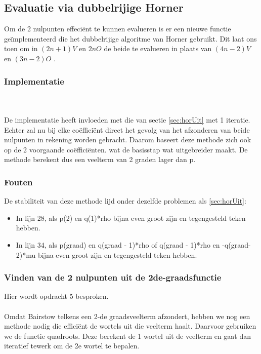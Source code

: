 \documentclass[a4paper,kulak]{kulakarticle}
\begin{document}
\subsection{Evaluatie via dubbelrijige Horner}

Om de 2 nulpunten effeciënt te kunnen evalueren is er een nieuwe functie geïmplementeerd die het dubbelrijige algoritme van Horner gebruikt. Dit laat ons toen om in $(2n+1)V$ en $2nO$ de beide te evalueren in plaats van $(4n-2)V$ en $(3n-2)O$ \cite{bultheel2006inleiding}.

\subsubsection{Implementatie}

~\\~\\
De implementatie heeft invloeden met die van sectie \ref{sec:horUit} met 1 iteratie. Echter zal nu bij elke coëfficiënt direct het gevolg van het afzonderen van beide nulpunten in rekening worden gebracht. Daarom baseert deze methode zich ook op de 2 voorgaande coëfficiënten. wat de basisstap wat uitgebreider maakt. De methode berekent dus een veelterm van 2 graden lager dan p. 

\subsubsection{Fouten}

De stabiliteit van deze methode lijd onder dezelfde problemen als \ref{sec:horUit}:
\begin{itemize}
	\item In lijn 28, als p(2) en q(1)*rho bijna even groot zijn en tegengesteld teken hebben.
	\item In lijn 34, als p(graad) en q(graad - 1)*rho of q(graad - 1)*rho en -q(graad-2)*mu bijna even groot zijn en tegengesteld teken hebben.
\end{itemize}
\subsubsection{Vinden van de 2 nulpunten uit de 2de-graadsfunctie}
Hier wordt opdracht 5 besproken.
\\~\\
Omdat Bairstow telkens een 2-de graadsveelterm afzondert, hebben we nog een methode nodig die efficiënt de wortels uit die veelterm haalt. Daarvoor gebruiken we de functie quadroots. Deze berekent de 1 wortel uit de veelterm en gaat dan iteratief tewerk om de 2e wortel te bepalen.
\end{document}
